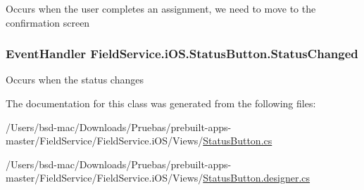 Occurs when the user completes an assignment, we need to move to the confirmation screen 

\hypertarget{class_field_service_1_1i_o_s_1_1_status_button_a302529aba6fca58f3b31dda51473d4e5}{
\subsubsection[{Status\+Changed}]{\setlength{\rightskip}{0pt plus 5cm}Event\+Handler Field\+Service.\+i\+O\+S.\+Status\+Button.\+Status\+Changed}}\label{class_field_service_1_1i_o_s_1_1_status_button_a302529aba6fca58f3b31dda51473d4e5}


Occurs when the status changes 



The documentation for this class was generated from the following files\+:\begin{DoxyCompactItemize}
\item 
/\+Users/bsd-\/mac/\+Downloads/\+Pruebas/prebuilt-\/apps-\/master/\+Field\+Service/\+Field\+Service.\+i\+O\+S/\+Views/\hyperlink{_status_button_8cs}{Status\+Button.\+cs}\item 
/\+Users/bsd-\/mac/\+Downloads/\+Pruebas/prebuilt-\/apps-\/master/\+Field\+Service/\+Field\+Service.\+i\+O\+S/\+Views/\hyperlink{_status_button_8designer_8cs}{Status\+Button.\+designer.\+cs}\end{DoxyCompactItemize}
